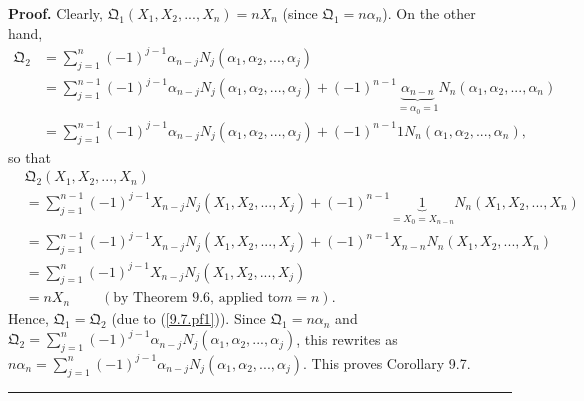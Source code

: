 \documentclass[numbers=enddot,12pt,final,onecolumn,notitlepage]{scrartcl}%
\newenvironment{proof}[1][Proof]{\noindent\textbf{#1.} }{\ \rule{0.5em}{0.5em}}
\begin{document}
\begin{proof}
Clearly, $\mathfrak{Q}_{1}\left(  X_{1},X_{2},...,X_{n}\right)  =nX_{n}$
(since $\mathfrak{Q}_{1}=n\alpha_{n}$). On the other hand,
\begin{align*}
\mathfrak{Q}_{2}  &  =\sum\limits_{j=1}^{n}\left(  -1\right)  ^{j-1}%
\alpha_{n-j}N_{j}\left(  \alpha_{1},\alpha_{2},...,\alpha_{j}\right) \\
&  =\sum\limits_{j=1}^{n-1}\left(  -1\right)  ^{j-1}\alpha_{n-j}N_{j}\left(
\alpha_{1},\alpha_{2},...,\alpha_{j}\right)  +\left(  -1\right)
^{n-1}\underbrace{\alpha_{n-n}}_{=\alpha_{0}=1}N_{n}\left(  \alpha_{1}%
,\alpha_{2},...,\alpha_{n}\right) \\
&  =\sum\limits_{j=1}^{n-1}\left(  -1\right)  ^{j-1}\alpha_{n-j}N_{j}\left(
\alpha_{1},\alpha_{2},...,\alpha_{j}\right)  +\left(  -1\right)  ^{n-1}%
1N_{n}\left(  \alpha_{1},\alpha_{2},...,\alpha_{n}\right)  ,
\end{align*}
so that%
\begin{align*}
&  \mathfrak{Q}_{2}\left(  X_{1},X_{2},...,X_{n}\right) \\
&  =\sum\limits_{j=1}^{n-1}\left(  -1\right)  ^{j-1}X_{n-j}N_{j}\left(
X_{1},X_{2},...,X_{j}\right)  +\left(  -1\right)  ^{n-1}\underbrace{1}%
_{=X_{0}=X_{n-n}}N_{n}\left(  X_{1},X_{2},...,X_{n}\right) \\
&  =\sum\limits_{j=1}^{n-1}\left(  -1\right)  ^{j-1}X_{n-j}N_{j}\left(
X_{1},X_{2},...,X_{j}\right)  +\left(  -1\right)  ^{n-1}X_{n-n}N_{n}\left(
X_{1},X_{2},...,X_{n}\right) \\
&  =\sum\limits_{j=1}^{n}\left(  -1\right)  ^{j-1}X_{n-j}N_{j}\left(
X_{1},X_{2},...,X_{j}\right) \\
&  =nX_{n}\ \ \ \ \ \ \ \ \ \ \left(  \text{by Theorem 9.6, applied to
}m=n\right)  .
\end{align*}
Hence, $\mathfrak{Q}_{1}=\mathfrak{Q}_{2}$ (due to (\ref{9.7.pf1})). Since
$\mathfrak{Q}_{1}=n\alpha_{n}$ and $\mathfrak{Q}_{2}=\sum\limits_{j=1}%
^{n}\left(  -1\right)  ^{j-1}\alpha_{n-j}N_{j}\left(  \alpha_{1},\alpha
_{2},...,\alpha_{j}\right)  $, this rewrites as $n\alpha_{n}=\sum
\limits_{j=1}^{n}\left(  -1\right)  ^{j-1}\alpha_{n-j}N_{j}\left(  \alpha
_{1},\alpha_{2},...,\alpha_{j}\right)  $. This proves Corollary 9.7.
\end{proof}
\end{document}
